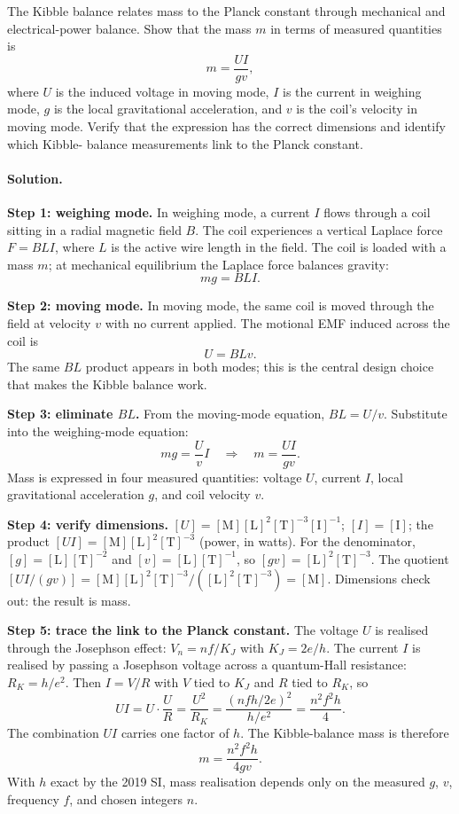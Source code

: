 \begin{exercise}
The Kibble balance relates mass to the Planck constant through
mechanical and electrical-power balance. Show that the mass $m$ in
terms of measured quantities is
\[
m = \frac{U I}{g v},
\]
where $U$ is the induced voltage in moving mode, $I$ is the current
in weighing mode, $g$ is the local gravitational acceleration, and
$v$ is the coil's velocity in moving mode. Verify that the
expression has the correct dimensions and identify which Kibble-
balance measurements link to the Planck constant.

\paragraph{Solution.}
\textbf{Step 1: weighing mode.} In weighing mode, a current $I$
flows through a coil sitting in a radial magnetic field $B$. The
coil experiences a vertical Laplace force $F = BLI$, where $L$ is
the active wire length in the field. The coil is loaded with a
mass $m$; at mechanical equilibrium the Laplace force balances
gravity:
\[
mg = BLI.
\]

\textbf{Step 2: moving mode.} In moving mode, the same coil is
moved through the field at velocity $v$ with no current applied.
The motional EMF induced across the coil is
\[
U = BLv.
\]
The same $BL$ product appears in both modes; this is the central
design choice that makes the Kibble balance work.

\textbf{Step 3: eliminate $BL$.} From the moving-mode equation,
$BL = U/v$. Substitute into the weighing-mode equation:
\[
mg = \frac{U}{v}I \quad\Longrightarrow\quad
m = \frac{UI}{gv}.
\]
Mass is expressed in four measured quantities: voltage $U$,
current $I$, local gravitational acceleration $g$, and coil
velocity $v$.

\textbf{Step 4: verify dimensions.}
$[U] = [\text{M}][\text{L}]^{2}[\text{T}]^{-3}[\text{I}]^{-1}$;
$[I] = [\text{I}]$; the product $[UI] = [\text{M}][\text{L}]^{2}
[\text{T}]^{-3}$ (power, in watts). For the denominator,
$[g] = [\text{L}][\text{T}]^{-2}$ and $[v] = [\text{L}]
[\text{T}]^{-1}$, so $[gv] = [\text{L}]^{2}[\text{T}]^{-3}$. The
quotient
$[UI/(gv)] = [\text{M}][\text{L}]^{2}[\text{T}]^{-3}/([\text{L}]^{2}
[\text{T}]^{-3}) = [\text{M}]$. Dimensions check out: the result is
mass.

\textbf{Step 5: trace the link to the Planck constant.} The voltage
$U$ is realised through the Josephson effect: $V_{n} = nf/K_{J}$
with $K_{J} = 2e/h$. The current $I$ is realised by passing a
Josephson voltage across a quantum-Hall resistance: $R_{K} =
h/e^{2}$. Then $I = V/R$ with $V$ tied to $K_{J}$ and $R$ tied to
$R_{K}$, so
\[
UI = U \cdot \frac{U}{R} = \frac{U^{2}}{R_{K}}
= \frac{(nf h/2e)^{2}}{h/e^{2}}
= \frac{n^{2}f^{2}h}{4}.
\]
The combination $UI$ carries one factor of $h$. The Kibble-balance
mass is therefore
\[
m = \frac{n^{2}f^{2}h}{4gv}.
\]
With $h$ exact by the 2019 SI, mass realisation depends only on
the measured $g$, $v$, frequency $f$, and chosen integers $n$.


\end{exercise}
